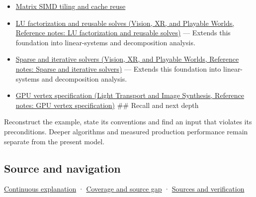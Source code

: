\begin{itemize}
\item
  \hyperref[appendix-1bfb7c657105]{Matrix SIMD tiling and cache reuse}
\item
  \href{../07-Vision-XR-and-Playable-Worlds/main.pdf\#nameddest=appendix-55e4b5b0a1e6}{LU factorization and reusable solves (Vision, XR, and Playable Worlds, Reference notes: LU factorization and reusable solves)} --- Extends this foundation into linear-systems and decomposition analysis.
\item
  \href{../07-Vision-XR-and-Playable-Worlds/main.pdf\#nameddest=appendix-67c87a3d9e94}{Sparse and iterative solvers (Vision, XR, and Playable Worlds, Reference notes: Sparse and iterative solvers)} --- Extends this foundation into linear-systems and decomposition analysis.
\item
  \href{../04-Light-Transport-and-Image-Synthesis/main.pdf\#nameddest=appendix-749ba51a6c25}{GPU vertex specification (Light Transport and Image Synthesis, Reference notes: GPU vertex specification)} \#\# Recall and next depth
\end{itemize}

Reconstruct the example, state its conventions and find an input that violates its preconditions. Deeper algorithms and measured production performance remain separate from the present model.

\subsection{Source and navigation}\label{appendix-ffdc1d4e5350-source-and-navigation}

\hyperref[01-foundations-i-ch018-keep-the-promises-visible-while-moving-between-representations]{Continuous explanation} · \hyperref[appendix-fd090d982a15-phase-7---parts-601-700]{Coverage and source gap} · \hyperref[appendix-a103e7846d21-phase-7---source-analysis-and-verification]{Sources and verification}
